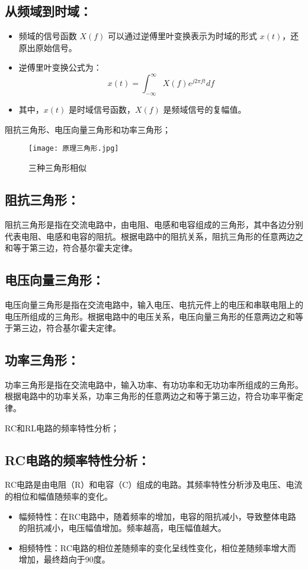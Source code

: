 \documentclass[dvipsnames, svgnames,a4paper,11pt]{article}
\begin{document}
\subsection*{从频域到时域：}
\begin{itemize}
  \item 频域的信号函数 $X(f)$ 可以通过逆傅里叶变换表示为时域的形式 $x(t)$，还原出原始信号。
  \item 逆傅里叶变换公式为：
    \[
    x(t) = \int_{-\infty}^{\infty} X(f)e^{j2\pi ft} df
    \]
  \item 其中，$x(t)$ 是时域信号函数，$X(f)$ 是频域信号的复幅值。
\end{itemize}
	
	\begin{question}
		阻抗三角形、电压向量三角形和功率三角形；
	\end{question}
	\begin{figure}[{H}]
		\centering
		\texttt{[image: 原理三角形.jpg]}
		\caption{三种三角形相似}
		\label{}
	\end{figure}
	\subsection*{阻抗三角形：}
	阻抗三角形是指在交流电路中，由电阻、电感和电容组成的三角形，其中各边分别代表电阻、电感和电容的阻抗。根据电路中的阻抗关系，阻抗三角形的任意两边之和等于第三边，符合基尔霍夫定律。
	
	\subsection*{电压向量三角形：}
	电压向量三角形是指在交流电路中，输入电压、电抗元件上的电压和串联电阻上的电压所组成的三角形。根据电路中的电压关系，电压向量三角形的任意两边之和等于第三边，符合基尔霍夫定律。
	
	\subsection*{功率三角形：}
	功率三角形是指在交流电路中，输入功率、有功功率和无功功率所组成的三角形。根据电路中的功率关系，功率三角形的任意两边之和等于第三边，符合功率平衡定律。
	


	\begin{question}
		RC和RL电路的频率特性分析；
	\end{question}
	\subsection*{RC电路的频率特性分析：}
RC电路是由电阻（R）和电容（C）组成的电路。其频率特性分析涉及电压、电流的相位和幅值随频率的变化。
\begin{itemize}
  \item 幅频特性：在RC电路中，随着频率的增加，电容的阻抗减小，导致整体电路的阻抗减小，电压幅值增加。频率越高，电压幅值越大。
  \item 相频特性：RC电路的相位差随频率的变化呈线性变化，相位差随频率增大而增加，最终趋向于90度。
\end{itemize}
\end{document}
